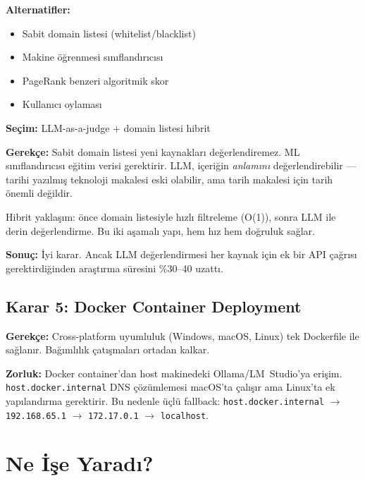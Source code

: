 \textbf{Alternatifler:}
\begin{itemize}
  \item Sabit domain listesi (whitelist/blacklist)
  \item Makine \"{o}\u{g}renmesi s{\i}n{\i}fland{\i}r{\i}c{\i}s{\i}
  \item PageRank benzeri algoritmik skor
  \item Kullan{\i}c{\i} oylamas{\i}
\end{itemize}

\textbf{Se\c{c}im:} LLM-as-a-judge + domain listesi hibrit

\textbf{Gerek\c{c}e:} Sabit domain listesi yeni kaynaklar{\i} de\u{g}erlendiremez. ML s{\i}n{\i}fland{\i}r{\i}c{\i}s{\i} e\u{g}itim verisi gerektirir. LLM, i\c{c}eri\u{g}in \textit{anlam{\i}n{\i}} de\u{g}erlendirebilir --- tarihi yaz{\i}lm{\i}\c{s} teknoloji makalesi eski olabilir, ama tarih makalesi i\c{c}in tarih \"{o}nemli de\u{g}ildir.

Hibrit yakla\c{s}{\i}m: \"{o}nce domain listesiyle h{\i}zl{\i} filtreleme (O(1)), sonra LLM ile derin de\u{g}erlendirme. Bu iki a\c{s}amal{\i} yap{\i}, hem h{\i}z hem doğruluk sa\u{g}lar.

\textbf{Sonu\c{c}:} \.{I}yi karar. Ancak LLM de\u{g}erlendirmesi her kaynak i\c{c}in ek bir API \c{c}a\u{g}r{\i}s{\i} gerektirdi\u{g}inden ara\c{s}t{\i}rma s\"{u}resini \%30--40 uzatt{\i}.

\subsection{Karar 5: Docker Container Deployment}

\textbf{Gerek\c{c}e:} Cross-platform uyumluluk (Windows, macOS, Linux) tek Dockerfile ile sa\u{g}lan{\i}r. Ba\u{g}{\i}ml{\i}l{\i}k \c{c}at{\i}\c{s}malar{\i} ortadan kalkar.

\textbf{Zorluk:} Docker container'dan host makinedeki Ollama/LM~Studio'ya eri\c{s}im. \texttt{host.docker.internal} DNS \c{c}\"{o}z\"{u}mlemesi macOS'ta \c{c}al{\i}\c{s}{\i}r ama Linux'ta ek yap{\i}land{\i}rma gerektirir. Bu nedenle \"{u}\c{c}l\"{u} fallback: \texttt{host.docker.internal} $\rightarrow$ \texttt{192.168.65.1} $\rightarrow$ \texttt{172.17.0.1} $\rightarrow$ \texttt{localhost}.

\section{Ne \.{I}\c{s}e Yarad{\i}?}

